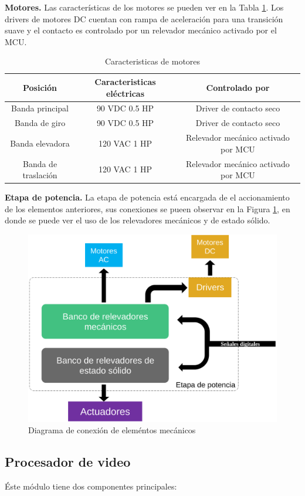 \documentclass[twoside,spanish,ESP,MSc]{plantillaLabUPV}
\theoremstyle{definition}
\begin{document}
\checkmark\textbf{Motores.} Las características de los motores se pueden ver en la Tabla \ref{motorestab}. Los drivers de motores DC cuentan con rampa de aceleración para una transición suave y el contacto es controlado por un relevador mecánico activado por el MCU.

\begin{table}[!tbh]
	\caption{Caracteristicas de motores}
	\label{motorestab}
\begin{tabular}{ccc}
	\textbf{Posición} & \textbf{Caracteristicas eléctricas} & \textbf{Controlado por} \\ 
	\hline 
	Banda principal & 90 VDC 0.5 HP & Driver de contacto seco \\ 
	\hline 
	Banda de giro & 90 VDC 0.5 HP & Driver de contacto seco \\ 
	\hline 
	Banda elevadora & 120 VAC 1 HP & Relevador mecánico activado por MCU \\ 
	\hline 
	Banda de traslación & 120 VAC 1 HP & Relevador mecánico activado por MCU\\ 
\end{tabular} 
\end{table}




\checkmark\textbf{Etapa de potencia.} La etapa de  potencia está encargada de el accionamiento de los elementos anteriores, sus conexiones se pueen observar en la Figura \ref{fig:etapapotencia}, en donde se puede ver el uso de los relevadores mecánicos y de estado sólido.

\begin{figure}
	\centering
	\includegraphics[width=0.7\linewidth]{edrawimas/etapapotencia}
	\caption{Diagrama de conexión de eleméntos mecánicos}
	\label{fig:etapapotencia}
\end{figure}


\subsection{Procesador de video}
Éste módulo tiene dos componentes principales:
\end{document}
